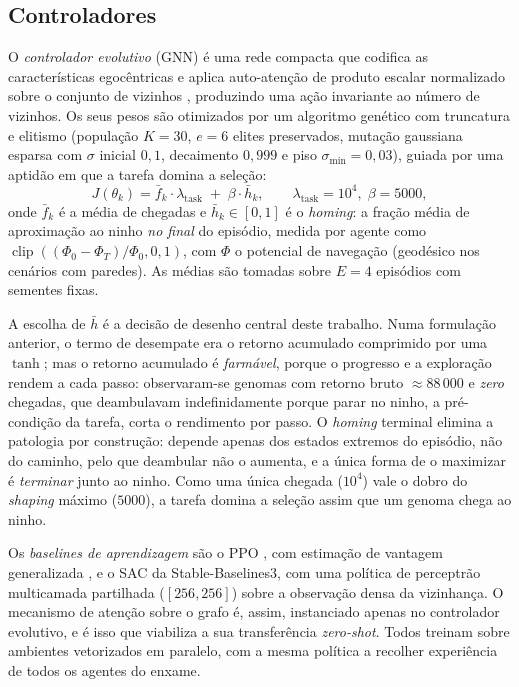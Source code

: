 \documentclass[final,5p,times,twocolumn,authoryear]{elsarticle}
\begin{document}
\subsection{Controladores}
O \emph{controlador evolutivo} (GNN) é uma rede compacta que codifica as
características egocêntricas e aplica auto-atenção de produto escalar normalizado
sobre o conjunto de vizinhos \citep{vaswani2017attention}, produzindo uma ação
invariante ao número de vizinhos. Os seus pesos são otimizados por um algoritmo
genético com truncatura e elitismo \citep{such2017deep} (população $K=30$, $e=6$ elites preservados,
mutação gaussiana esparsa com $\sigma$ inicial $0{,}1$, decaimento $0{,}999$ e piso
$\sigma_{\min}=0{,}03$), guiada por uma aptidão em que a tarefa domina a seleção:
\begin{equation}
J(\theta_k) = \bar{f}_k \cdot \lambda_{\text{task}} \;+\; \beta \cdot \bar{h}_k,
\qquad \lambda_{\text{task}} = 10^4,\; \beta = 5000,
\label{eq:fitness}
\end{equation}
onde $\bar{f}_k$ é a média de chegadas e $\bar{h}_k \in [0,1]$ é o
\emph{homing}: a fração média de aproximação ao ninho \emph{no final} do episódio,
medida por agente como $\operatorname{clip}((\Phi_0 - \Phi_T)/\Phi_0, 0, 1)$, com
$\Phi$ o potencial de navegação (geodésico nos cenários com paredes). As médias
são tomadas sobre $E=4$ episódios com sementes fixas.

A escolha de $\bar{h}$ é a decisão de desenho central deste trabalho. Numa
formulação anterior, o termo de desempate era o retorno acumulado comprimido por
uma $\tanh$; mas o retorno acumulado é \emph{farmável}, porque o progresso e a
exploração rendem a cada passo: observaram-se genomas com retorno bruto
$\approx 88\,000$ e \emph{zero} chegadas, que deambulavam indefinidamente porque
parar no ninho, a pré-condição da tarefa, corta o rendimento por passo. O
\emph{homing} terminal elimina a patologia por construção: depende apenas dos
estados extremos do episódio, não do caminho, pelo que deambular não o aumenta, e
a única forma de o maximizar é \emph{terminar} junto ao ninho. Como uma única
chegada ($10^4$) vale o dobro do \emph{shaping} máximo ($5000$), a tarefa domina
a seleção assim que um genoma chega ao ninho.

Os \emph{baselines de aprendizagem} são o PPO \citep{schulman2017ppo}, com
estimação de vantagem generalizada \citep{schulman2016gae}, e o SAC
\citep{haarnoja2018sac} da Stable-Baselines3, com uma política de perceptrão
multicamada partilhada ($[256,256]$) sobre a observação densa da vizinhança. O
mecanismo de atenção sobre o grafo é, assim, instanciado apenas no controlador
evolutivo, e é isso que viabiliza a sua transferência
\emph{zero-shot}. Todos treinam sobre ambientes vetorizados em paralelo, com a
mesma política a recolher experiência de todos os agentes do enxame.
\end{document}
